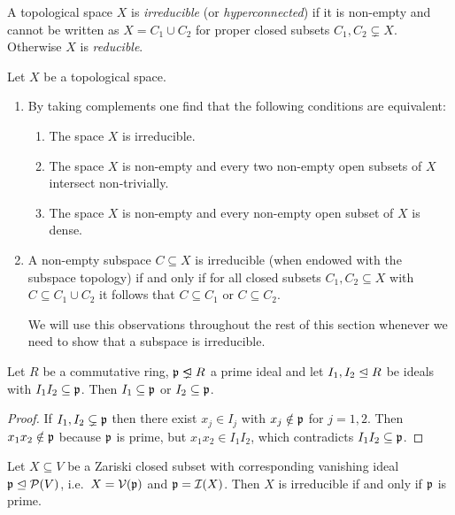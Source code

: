 \begin{definition}
  A topological space $X$ is \emph{irreducible} (or \emph{hyperconnected}) if it is non-empty and cannot be written as $X = C_1 \cup C_2$ for proper closed subsets $C_1, C_2 \subsetneq X$.
  Otherwise $X$ is \emph{reducible}.
\end{definition}


\begin{remark}
  Let $X$ be a topological space.
  \begin{enumerate}
    \item
      By taking complements one find that the following conditions are equivalent:
      \begin{enumerate}
        \item
          The space $X$ is irreducible.
        \item
          The space $X$ is non-empty and every two non-empty open subsets of $X$ intersect non-trivially.
        \item
          The space $X$ is non-empty and every non-empty open subset of $X$ is dense.
      \end{enumerate}
    \item
      A non-empty subspace $C \subseteq X$ is irreducible (when endowed with the subspace topology) if and only if for all closed subsets $C_1, C_2 \subseteq X$ with $C \subseteq C_1 \cup C_2$ it follows that $C \subseteq C_1$ or $C \subseteq C_2$.
      
      We will use this observations throughout the rest of this section whenever we need to show that a subspace is irreducible.
  \end{enumerate}
\end{remark}


\begin{lemma}
  \label{lemma: trivial prime avoidance}
  Let $R$ be a commutative ring, $\mf{p} \ideallneq R$ a prime ideal and let $I_1, I_2 \trianglelefteq R$ be ideals with $I_1 I_2 \subseteq \mathfrak{p}$.
  Then $I_1 \subseteq \mathfrak{p}$ or $I_2 \subseteq \mathfrak{p}$.
\end{lemma}


\begin{proof}
  If $I_1, I_2 \subsetneq \mathfrak{p}$ then there exist $x_j \in I_j$ with $x_j \notin \mathfrak{p}$ for $j = 1,2$.
  Then $x_1 x_2 \notin \mathfrak{p}$ because $\mathfrak{p}$ is prime, but $x_1 x_2 \in I_1 I_2$, which contradicts $I_1 I_2 \subseteq \mathfrak{p}$.
\end{proof}


\begin{lemma}
  \label{lemma: X is irreducible iff I(X) is prime}
  Let $X \subseteq V$ be a Zariski closed subset with corresponding vanishing ideal $\mathfrak{p} \trianglelefteq \mathcal{P}(V)$, i.e.\ $X = \mathcal{V}(\mathfrak{p})$ and $\mathfrak{p} = \mathcal{I}(X)$.
  Then $X$ is irreducible if and only if $\mathfrak{p}$ is prime.
\end{lemma}


